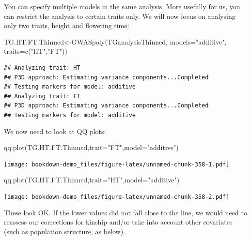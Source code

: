 \documentclass[
]{book}
\newenvironment{Shaded}{\begin{snugshade}}{\end{snugshade}}
\newcommand{\AttributeTok}[1]{\textcolor[rgb]{0.77,0.63,0.00}{#1}}
\newcommand{\FunctionTok}[1]{\textcolor[rgb]{0.00,0.00,0.00}{#1}}
\newcommand{\NormalTok}[1]{#1}
\newcommand{\OtherTok}[1]{\textcolor[rgb]{0.56,0.35,0.01}{#1}}
\newcommand{\StringTok}[1]{\textcolor[rgb]{0.31,0.60,0.02}{#1}}
\begin{document}
You can specify multiple models in the same analysis. More usefully for us, you can restrict the analysis to certain traits only. We will now focus on analysing only two traits, height and flowering time:

\begin{Shaded}
\begin{Highlighting}[]
\NormalTok{TG.HT.FT.Thinned}\OtherTok{\textless{}{-}}\FunctionTok{GWASpoly}\NormalTok{(TGanalysisThinned, }\AttributeTok{models=}\StringTok{"additive"}\NormalTok{, }\AttributeTok{traits=}\FunctionTok{c}\NormalTok{(}\StringTok{"HT"}\NormalTok{,}\StringTok{"FT"}\NormalTok{)) }
\end{Highlighting}
\end{Shaded}

\begin{verbatim}
## Analyzing trait: HT 
## P3D approach: Estimating variance components...Completed 
## Testing markers for model: additive 
## Analyzing trait: FT 
## P3D approach: Estimating variance components...Completed 
## Testing markers for model: additive
\end{verbatim}

We now need to look at QQ plots:

\begin{Shaded}
\begin{Highlighting}[]
\FunctionTok{qq.plot}\NormalTok{(TG.HT.FT.Thinned,}\AttributeTok{trait=}\StringTok{"FT"}\NormalTok{,}\AttributeTok{model=}\StringTok{"additive"}\NormalTok{)}
\end{Highlighting}
\end{Shaded}

\texttt{[image: bookdown-demo\_files/figure-latex/unnamed-chunk-358-1.pdf]}

\begin{Shaded}
\begin{Highlighting}[]
\FunctionTok{qq.plot}\NormalTok{(TG.HT.FT.Thinned,}\AttributeTok{trait=}\StringTok{"HT"}\NormalTok{,}\AttributeTok{model=}\StringTok{"additive"}\NormalTok{)}
\end{Highlighting}
\end{Shaded}

\texttt{[image: bookdown-demo\_files/figure-latex/unnamed-chunk-358-2.pdf]}

These look OK. If the lower values did not fall close to the line, we would need to reassess our corrections for kinship and/or take into account other covariates (such as population structure, as below).
\end{document}
